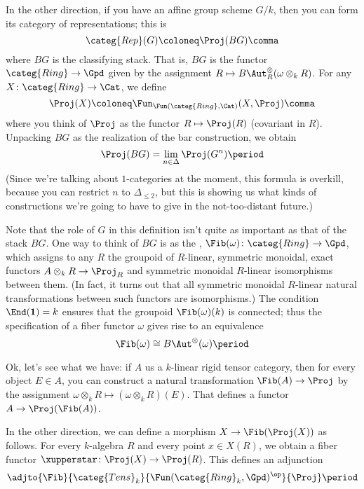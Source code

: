 \documentclass[leqno]{article}
\begin{document}
In the other direction, if you have an affine group scheme \(G/k\),
then you can form its category of representations;
this is
\begin{equation*}
    \categ{Rep}(G) \coloneq \Proj(BG) \comma
\end{equation*}
where \(BG\) is the classifying stack.
That is, \(BG\) is the functor \(\categ{Ring} \to \Gpd\)
given by the assignment
\(R \mapsto B\Aut_R^{\otimes}(\omega \otimes_k R)\).
For any \(X \colon \categ{Ring} \to \Cat\), we define
\begin{equation*}
    \Proj(X) \coloneq \Fun_{\Fun(\categ{Ring},\Cat)}(X, \Proj) \comma
\end{equation*}
where you think of \(\Proj\) as the functor \(R \mapsto \Proj(R)\)
(covariant in \(R\)).
Unpacking \(BG\) as the realization of the bar construction,
we obtain
\begin{equation*}
    \Proj(BG) = \lim_{n \in \Delta} \Proj(G^n) \period
\end{equation*}
(Since we're talking about \(1\)-categories at the moment,
this formula is overkill,
because you can restrict \(n\) to \(\Delta_{\leq 2}\),
but this is showing us what kinds of constructions we're going
to have to give in the not-too-distant future.)

Note that the role of \(G\) in this definition
isn't quite as important as that of the stack \(BG\).
One way to think of \(BG\) is as the ,
\(\Fib(\omega) \colon \categ{Ring} \to \Gpd\),
which assigns to any \(R\) the groupoid of
\(R\)-linear, symmetric monoidal, exact functors
\(A \otimes_k R \to \Proj_R\)
and symmetric monoidal \(R\)-linear isomorphisms between them.
(In fact, it turns out that all symmetric monoidal
\(R\)-linear natural transformations between such functors are
isomorphisms.)
The condition \(\End(\mathbf{1}) = k\) ensures that
the groupoid \(\Fib(\omega)(k)\) is connected;
thus the specification of a fiber functor \(\omega\) gives rise to
an equivalence 
\begin{equation*}
    \Fib(\omega) \cong B\Aut^{\otimes}(\omega) \period
\end{equation*}

Ok, let's see what we have:
if \(A\) us a \(k\)-linear rigid tensor category,
then for every object \(E \in A\),
you can construct a natural transformation \(\Fib(A) \to \Proj\)
by the assignment
\(\omega \otimes_k R \mapsto (\omega \otimes_k R)(E)\).
That defines a functor \(A \to \Proj(\Fib(A))\).

In the other direction, we can define a morphism
\(X \to \Fib(\Proj(X))\) as follows.
For every \(k\)-algebra \(R\) and every point \(x \in X(R)\),
we obtain a fiber functor \(\xupperstar \colon \Proj(X) \to \Proj(R)\).
This defines an adjunction
\begin{equation*}
    \adjto{\Fib}{\categ{Tens}_k}
    {\Fun(\categ{Ring}_k,\Gpd)^{\op}}{\Proj} \period
\end{equation*}
\end{document}
